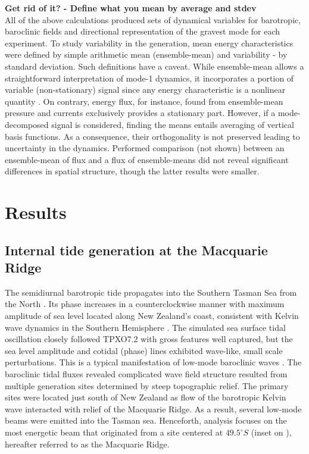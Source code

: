 \documentclass[12pt]{article}
\begin{document}
\textbf{Get rid of it? - Define what you mean by average and stdev}\\
All of the above calculations produced sets of dynamical variables for barotropic, baroclinic 
fields and directional representation of the gravest mode for each experiment. To study 
variability in the generation, mean energy characteristics were defined by simple arithmetic mean 
(ensemble-mean) and variability - by standard deviation. Such definitions have a caveat. 
While ensemble-mean allows a straightforward interpretation of mode-1 dynamics, it 
incorporates  
a portion of variable (non-stationary) signal since any energy characteristic is a nonlinear 
quantity \citep{zaron2014time}. On contrary, energy flux, for instance, found from ensemble-mean 
pressure and currents exclusively provides a stationary part. However, if a mode-decomposed signal 
is considered, finding the means entails averaging of vertical basis functions. As a 
consequence, their orthogonality is not preserved leading to uncertainty in the dynamics. 
Performed comparison (not shown) between an ensemble-mean of flux and a flux of ensemble-means did 
not reveal significant differences in spatial structure, though the latter results were smaller.

\newpage
\section{Results}
\subsection{Internal tide generation at the Macquarie Ridge}
\label{C3.sec:main_res}
The semidiurnal barotropic tide propagates into the Southern Tasman Sea from the North 
. Its phase increases in a counterclockwise manner with maximum amplitude of sea 
level located along New Zealand's coast, consistent with Kelvin wave dynamics in the Southern 
Hemisphere \citep{walters2001ocean}. The simulated sea surface tidal oscillation closely followed 
TPXO7.2 with 
gross 
features well captured, but the sea level amplitude and cotidal (phase) lines exhibited wave-like, 
small scale perturbations. This is a typical manifestation of low-mode baroclinic waves 
\citep{niwa2004three}. The baroclinic tidal fluxes  revealed complicated wave 
field structure resulted from 
multiple generation sites determined by steep topographic relief. The primary sites were located  
just south of New Zealand as flow of the barotropic Kelvin wave interacted with relief of the 
Macquarie Ridge. As a result, several low-mode beams \citep{rainville2010interference} were emitted 
into the Tasman 
sea. Henceforth, analysis focuses on the most energetic beam that originated from a site centered 
at 
$49.5^{\circ}S$ (inset on ), hereafter referred to as the Macquarie 
Ridge.\\
\end{document}
